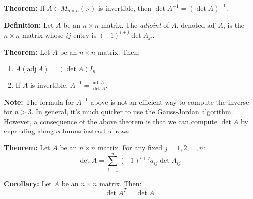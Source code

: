 \documentclass{article}
\newcommand{\adj}[1]{\mathrm{adj}\,#1}
\begin{document}
\begin{minipage}[t]{0.45\linewidth}
        \textbf{Theorem:} If $A \in M_{n\times n}(\mathbb{R})$ is invertible, then $\det A^{-1} = (\det A)^{-1}$.
        \vspace{2mm}

        \textbf{Definition:} Let $A$ be an $n\times n$ matrix. The \textit{adjoint} of $A$, denoted $\adj A$, is the $n\times n$ matrix whose $ij$ entry is $(-1)^{i+j}\det A_{ji}$.
        \vspace{2mm}

        \textbf{Theorem:} Let $A$ be an $n\times n$ matrix. Then:
        \begin{enumerate}
            \item $A(\adj A) = (\det A)I_n$
            \item If $A$ is invertible, $A^{-1} = \frac{\adj A}{\det A}$.
        \end{enumerate}
        \vspace{2mm}

        \textbf{Note:} The formula for $A^{-1}$ above is not an efficient way to compute the inverse for $n>3$. In general, it's much quicker to use the Gauss-Jordan algorithm. However, a consequence of the above theorem is that we can compute $\det A$ by expanding along columns instead of rows.
        \vspace{2mm}

        \textbf{Theorem:} Let $A$ be an $n\times n$ matrix. For any fixed $j=1,2,\dots,n$:
        \begin{equation*}
            \det A = \sum_{i=1}^n (-1)^{i+j} a_{ij}\det A_{ij}
        \end{equation*}
        \vspace{2mm}

        \textbf{Corollary:} Let $A$ be an $n\times n$ matrix. Then:
        \begin{equation*}
            \det A^T = \det A
        \end{equation*}
    \end{minipage}
    \newpage
\end{document}
